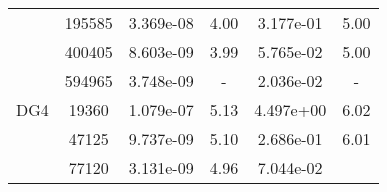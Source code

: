 \begin{table}
\begin{center}
{\begin{tabular}{| l | c | c | c | c | c |}
            &195585
            
                &3.369e-08
                
                &4.00
                
                &3.177e-01
                
                &5.00\\
                
            &400405
            
                &8.603e-09
                
                &3.99
                
                &5.765e-02
                
                &5.00\\
                
            &594965
            
                &3.748e-09
                
                &-
                
                &2.036e-02
                
                &-\\
                \hline
        \hline
        \hspace{0.1cm}DG4\hspace{0.1cm}    
        
            &19360
            
                &1.079e-07
                
                &5.13
                
                &4.497e+00
                
                &6.02\\
                
            &47125
            
                &9.737e-09
                
                &5.10
                
                &2.686e-01
                
                &6.01\\
                
            &77120
            
                &3.131e-09
                
                &4.96
                
                &7.044e-02
                

\end{tabular}}
\end{center}
\end{table}
